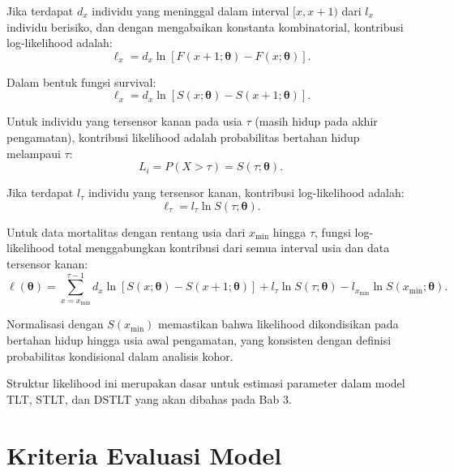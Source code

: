 Jika terdapat $d_x$ individu yang meninggal dalam interval $[x, x+1)$ dari $l_x$ individu berisiko, dan dengan mengabaikan konstanta kombinatorial, kontribusi log-likelihood adalah:
\begin{equation}
\ell_x = d_x \ln[F(x+1; \boldsymbol{\theta}) - F(x; \boldsymbol{\theta})].
\label{eq:loglik_interval}
\end{equation}

Dalam bentuk fungsi survival:
\begin{equation}
\ell_x = d_x \ln[S(x; \boldsymbol{\theta}) - S(x+1; \boldsymbol{\theta})].
\label{eq:loglik_interval_survival}
\end{equation}

Untuk individu yang tersensor kanan pada usia $\tau$ (masih hidup pada akhir pengamatan), kontribusi likelihood adalah probabilitas bertahan hidup melampaui $\tau$:
\begin{equation}
L_i = P(X > \tau) = S(\tau; \boldsymbol{\theta}).
\label{eq:likelihood_right_censored}
\end{equation}

Jika terdapat $l_\tau$ individu yang tersensor kanan, kontribusi log-likelihood adalah:
\begin{equation}
\ell_{\tau} = l_\tau \ln S(\tau; \boldsymbol{\theta}).
\label{eq:loglik_right_censored}
\end{equation}

Untuk data mortalitas dengan rentang usia dari $x_{\min}$ hingga $\tau$, fungsi log-likelihood total menggabungkan kontribusi dari semua interval usia dan data tersensor kanan:
\begin{equation}
\ell(\boldsymbol{\theta}) = \sum_{x=x_{\min}}^{\tau-1} d_x \ln[S(x; \boldsymbol{\theta}) - S(x+1; \boldsymbol{\theta})] + l_\tau \ln S(\tau; \boldsymbol{\theta}) - l_{x_{\min}} \ln S(x_{\min}; \boldsymbol{\theta}).
\label{eq:loglik_total_censored}
\end{equation}

Normalisasi dengan $S(x_{\min})$ memastikan bahwa likelihood dikondisikan pada bertahan hidup hingga usia awal pengamatan, yang konsisten dengan definisi probabilitas kondisional dalam analisis kohor.

Struktur likelihood ini merupakan dasar untuk estimasi parameter dalam model TLT, STLT, dan DSTLT yang akan dibahas pada Bab 3.



\section{Kriteria Evaluasi Model}

